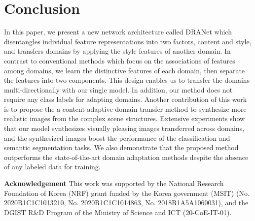 \documentclass[final]{cvpr}
\begin{document}
\section{Conclusion}
\label{sec:conclusion}
In this paper, we present a new network architecture called DRANet which disentangles individual feature representations into two factors, content and style, and transfers domains by applying the style features of another domain.
In contrast to conventional methods which focus on the associations of features among domains, we learn the distinctive features of each domain, then separate the features into two components. 
This design enables us to transfer the domains multi-directionally with our single model.
In addition, our method does not require any class labels for adapting domains.
Another contribution of this work is to propose the a content-adaptive domain transfer method to synthesize more realistic images from the complex scene structures.
Extensive experiments show that our model synthesizes visually pleasing images transferred across domains, and the synthesized images boost the performance of the classification and semantic segmentation tasks.
We also demonstrate that the proposed method outperforms the state-of-the-art domain adaptation methods despite the absence of any labeled data for training.


{\footnotesize
\noindent \textbf{Acknowledgement} This work was supported by the National Research Foundation of Korea (NRF) grant funded by the Korea government (MSIT) (No. 2020R1C1C1013210, No. 2020R1C1C1014863, No. 2018R1A5A1060031), and the DGIST R\&D Program of the Ministry of Science and ICT (20-CoE-IT-01).
}

\clearpage
{\small


}
\end{document}
